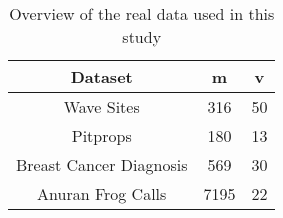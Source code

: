 \begin{table}
	\begin{center}
		\begin{tabular}{c|c|c}
			Dataset & m & v \\
			\hline
			Wave Sites & 316 & 50 \\
			Pitprops & 180 & 13 \\
			Breast Cancer Diagnosis & 569 & 30 \\
			Anuran Frog Calls & 7195 & 22 \\
		\end{tabular}
	\end{center}
	\caption{Overview of the real data used in this study}
\end{table}